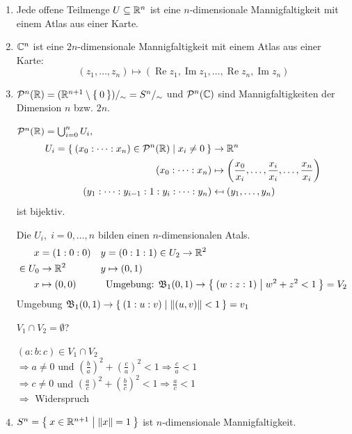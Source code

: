 \begin{beispiel}
    \begin{enumerate}[label=\arabic*)]
        \item Jede offene Teilmenge $U \subseteq \mathbb{R}^n$ ist eine 
              $n$-dimensionale Mannigfaltigkeit mit einem Atlas aus 
              einer Karte.
        \item $\mathbb{C}^n$ ist eine $2n$-dimensionale Mannigfaltigkeit
              mit einem Atlas aus einer Karte:
              \[(z_1, \dots, z_n) \mapsto (\operatorname{Re} z_1, \operatorname{Im}z_1, \dots, \operatorname{Re}z_n, \operatorname{Im}z_n)\]
        \item $\mathcal{P}^n(\mathbb{R}) = (\mathbb{R}^{n+1} \setminus \Set{0})/_\sim = S^n /_\sim$ und $\mathcal{P}^n(\mathbb{C})$ sind Mannigfaltigkeiten 
              der Dimension $n$ bzw. $2n$.

              $\mathcal{P}^n(\mathbb{R}) = \bigcup_{i=0}^n U_i,$
              \begin{align*}
U_i = \Set{(x_0: \dots : x_n) \in \praum^n(\mdr) | x_i \neq 0} &\rightarrow \mdr^n\\
                (x_0 : \dots : x_n) &\mapsto \left (\frac{x_0}{x_i}, \dots, \frac{x_i}{x_i}, \dots, \frac{x_n}{x_i} \right )\\
                (y_1 : \dots : y_{i-1} : 1 : y_i : \dots : y_n) &\mapsfrom (y_1, \dots, y_n)
              \end{align*}
              ist bijektiv.

              Die $U_i,\; i = 0, \dots, n$ bilden einen $n$-dimensionalen Atals.
              \begin{align*}
                      x &= (1:0:0)            &y &= (0:1:1) \in U_2 \rightarrow \mathbb{R}^2\\
                \in U_0 &\rightarrow \mathbb{R}^2   &y &\mapsto (0,1)\\
                      x &\mapsto (0,0)        &&\text{Umgebung: } \mathfrak{B}_1 (0,1) \rightarrow \Set{(w:z:1) | w^2 + z^2 < 1} = V_2
              \end{align*}
              Umgebung $\mathfrak{B}_1(0,1) \rightarrow \Set{(1:u:v) | \|(u,v)\| < 1} = v_1$

              $V_1 \cap V_2 = \emptyset$?

              $(a:b:c) \in V_1 \cap V_2$\\
              $\Rightarrow a \neq 0$ und $(\frac{b}{a})^2 + (\frac{c}{a})^2 < 1 \Rightarrow \frac{c}{a} < 1$\\
              $\Rightarrow c \neq 0$ und $(\frac{a}{c})^2 + (\frac{b}{c})^2 < 1 \Rightarrow \frac{a}{c} < 1$\\
              $\Rightarrow$ Widerspruch
        \item $S^n = \Set{x \in \ensuremath{\mathbb{R}}^{n+1} | \|x\| = 1}$ ist $n$-dimensionale
              Mannigfaltigkeit.


\end{enumerate}
\end{beispiel}
